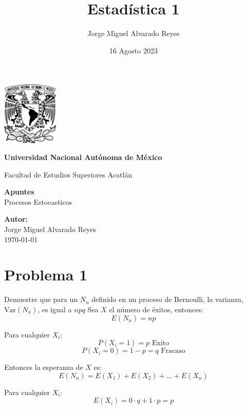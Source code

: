 \documentclass{article}
\title{Estadística 1}
\author{Jorge Miguel Alvarado Reyes}
\date{16 Agosto 2023}
\begin{document}
\begin{titlepage}
    \begin{center}
        \includegraphics[width=0.2\textwidth]{../../unam.png}
        \vspace*{.5cm}

        \LARGE
        \textbf{Universidad Nacional Autónoma de México}

        \vspace{0.5cm}
        \LARGE
        Facultad de Estudios Superiores Acatlán

        \vspace{2cm}

        \textbf{Apuntes} \\
        Procesos Estocasticos

        \vfill

        \vspace{1cm}

        \textbf{\large Autor:} \\
        Jorge Miguel Alvarado Reyes \\
        \vspace{.5cm}
        \normalsize \today

    \end{center}
\end{titlepage}
\newpage

\tableofcontents

\newpage

\section{Problema 1}

Demuestre que para un $N_n$ definido en un proceso de Bernoulli, la varianza, $\text{Var}(N_n)$, es igual a $npq$
Sea \( X \) el número de éxitos, entonces:
\[ E(N_n) = np \]

Para cualquier \( X_i \):
\[ P(X_i = 1) = p \text{ Exito}\]
\[ P(X_i = 0) = 1 - p = q \text{ Fracaso}\]

Entonces la esperanza de \( X \) es:
\[ E(N_n) = E(X_1) + E(X_2) + \ldots + E(X_n) \]

Para cualquier \( X_i \):
\[ E(X_i) = 0 \cdot q + 1 \cdot p = p \]
\end{document}
